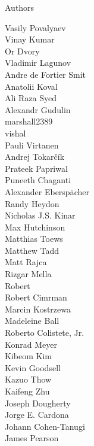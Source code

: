 \documentclass[xcolor=svgnames]{beamer}
\begin{document}
\begin{frame}{Authors}
\begin{multicols}{5}
Vasily Povalyaev\\
Vinay Kumar\\
Or Dvory\\
Vladimir Lagunov\\
Andre de Fortier Smit\\
Anatolii Koval\\
Ali Raza Syed\\
Alexandr Gudulin\\
marshall2389\\
vishal\\
Pauli Virtanen\\
Andrej Tokarčík\\
Prateek Papriwal\\
Puneeth Chaganti\\
Alexander Eberspächer\\
Randy Heydon\\
Nicholas J.S. Kinar\\
Max Hutchinson\\
Matthias Toews\\
Matthew Tadd\\
Matt Rajca\\
Rizgar Mella\\
Robert\\
Robert Cimrman\\
Marcin Kostrzewa\\
Madeleine Ball\\
Roberto Colistete, Jr.\\
Konrad Meyer\\
Kibeom Kim\\
Kevin Goodsell\\
Kazuo Thow\\
Kaifeng Zhu\\
Joseph Dougherty\\
Jorge E. Cardona\\
Johann Cohen-Tanugi\\
James Pearson\\
\end{multicols}
\end{frame}
\end{document}
